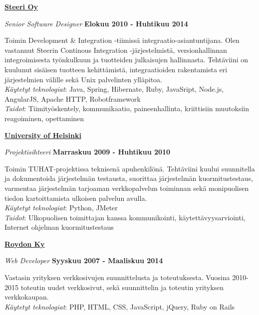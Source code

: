 \documentclass[10pt,finnish,a4paper]{article}
\newenvironment{outerlist}[1][\enskip\textbullet]%
        {\begin{itemize}[#1]}{\end{itemize}%
         \vspace{-.6\baselineskip}}
\newenvironment{innerlist}[1][\enskip\textbullet]%
        {\begin{compactitem}[#1]}{\end{compactitem}}
\newcommand{\blankline}{\quad\pagebreak[2]}
\begin{document}
\href{http://steeri.fi/}{\textbf{Steeri Oy}}
\begin{outerlist}

\item[] \textit{Senior Software Designer}
    \hfill \textbf{Elokuu 2010 - Huhtikuu 2014}
    \begin{innerlist}
		\item Toimin Development \& Integration -tiimissä integraatio-asiantuntijana. Olen vastannut Steerin Continous Integration -järjestelmistä, versionhallinnan integroimisesta työnkulkuun ja tuotteiden julkaisujen hallinnasta. Tehtäviini on kuulunut sisäisen tuotteen kehittämistä, integraatioiden rakentamista eri järjestelmien välille sekä Unix palvelinten ylläpitoa.\\


         \emph{Käytetyt teknologiat}: Java, Spring, Hibernate, Ruby, JavaSript, Node.js, AngularJS, Apache HTTP, Robotframework\\
         \emph{Taidot}: Tiimityöskentely, kommunikaatio, paineenhallinta, kriittisiin muutoksiin reagoiminen, opettaminen
    \end{innerlist}
\end{outerlist}
\blankline

\href{http://www.helsinki.fi/university/index.html}{\textbf{University of Helsinki}}
\begin{outerlist}

\item[] \textit{Projektisihteeri}%
    \hfill \textbf{Marraskuu 2009 - Huhtikuu 2010}
    \begin{innerlist}
        \item Toimin TUHAT-projektissa teknisenä apuhenkilönä. Tehtäviini kuului suunnitella ja dokumentoida järjestelmän testausta, suorittaa järjestelmän kuormitustestaus, varmentaa järjestelmän tarjoaman verkkopalvelun toiminnan sekä monipuolisen tiedon kartoittamista ulkoisen palvelun avulla.\\

        \emph{Käytetyt teknologiat}: Python, JMeter\\
        \emph{Taidot}: Ulkopuolisen toimittajan kanssa kommunikointi, käytettävyysarviointi, Internet ohjelman kuormitustestaus
    \end{innerlist}
\end{outerlist}
\blankline

\href{http://roydon.fi}{\textbf{Roydon Ky}}
\begin{outerlist}

\item[] \textit{Web Developer}%
    \hfill \textbf{Syyskuu 2007 - Maaliskuu 2014}
    \begin{innerlist}
        \item Vastasin yrityksen verkkosivujen suunnittelusta ja toteutuksesta. Vuosina 2010-2015 toteutin uudet verkkosivut, sekä suunnittelin ja toteutin yrityksen verkkokaupan.\\

        \emph{Käytetyt teknologiat}: PHP, HTML, CSS, JavaScript, jQuery, Ruby on Rails\\
    \end{innerlist}
\end{outerlist}
\blankline
\end{document}
